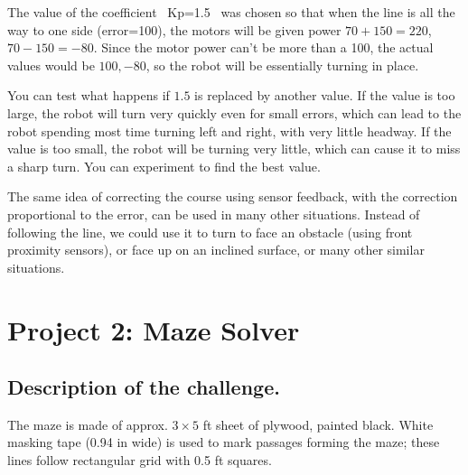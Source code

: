 \documentclass[oneside]{stml-l}
\numberwithin{figure}{chapter}
\begin{document}
The value of the coefficient ~Kp=1.5~ was chosen so that when the line is
all the way to one side (error=100), the motors will be given power
$70+150=220$, $70-150=-80$. Since the motor power can't be more than a 100,
the actual values would be $100, -80$, so the robot will be essentially
turning in place.

You can test what happens if $1.5$ is replaced by another value. If the
value is too large, the robot will turn very quickly even for small
errors, which can lead to the robot spending most time turning left
and right, with very little headway. If the value is too small, the
robot will be turning very little, which can cause it to miss a sharp
turn. You can experiment to find the best value.

The same idea of correcting the course using sensor feedback, with
the correction proportional to the error, can be used in many
other situations. Instead of following the line, we could use it
to turn to  face an obstacle (using front proximity sensors), or
face up on an inclined surface, or many other similar situations.

\chapter{Project 2: Maze Solver}
\section{Description of the challenge.} The maze is made of
approx. $3\times 5$ ft sheet of plywood, painted black.
White masking tape (0.94 in wide) is used to mark passages
forming the maze; these lines follow rectangular grid with
0.5 ft squares.


\end{document}
